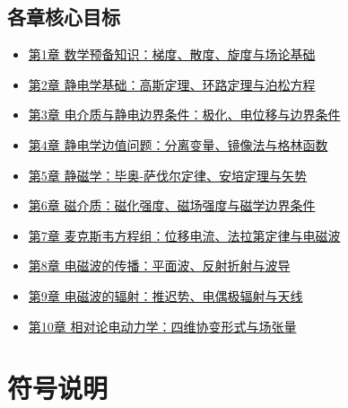 \documentclass[11pt,a4paper,openany,oneside]{book}
\begin{document}
\section*{各章核心目标}
\begin{itemize}
\item \hyperlink{ch1-goal}{第1章 数学预备知识：梯度、散度、旋度与场论基础}
\item \hyperlink{ch2-goal}{第2章 静电学基础：高斯定理、环路定理与泊松方程}
\item \hyperlink{ch3-goal}{第3章 电介质与静电边界条件：极化、电位移与边界条件}
\item \hyperlink{ch4-goal}{第4章 静电学边值问题：分离变量、镜像法与格林函数}
\item \hyperlink{ch5-goal}{第5章 静磁学：毕奥-萨伐尔定律、安培定理与矢势}
\item \hyperlink{ch6-goal}{第6章 磁介质：磁化强度、磁场强度与磁学边界条件}
\item \hyperlink{ch7-goal}{第7章 麦克斯韦方程组：位移电流、法拉第定律与电磁波}
\item \hyperlink{ch8-goal}{第8章 电磁波的传播：平面波、反射折射与波导}
\item \hyperlink{ch9-goal}{第9章 电磁波的辐射：推迟势、电偶极辐射与天线}
\item \hyperlink{ch10-goal}{第10章 相对论电动力学：四维协变形式与场张量}
\end{itemize}
\newpage


\chapter*{符号说明}
\end{document}
